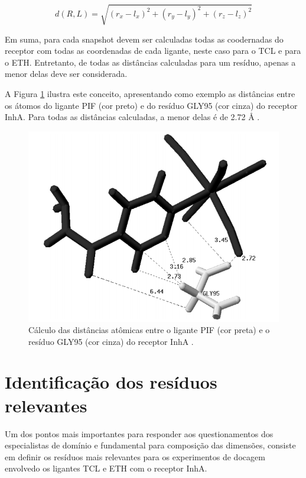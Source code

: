 \begin{equation}
\label{eqt:distEuclid}
	d(R,L)=\sqrt{(r_{x}-l_{x})^{2}+(r_{y}-l_{y})^{2}+(r_{z}-l_{z})^{2}}
\end{equation}

Em suma, para cada snapshot devem ser calculadas todas as coodernadas do receptor com todas as coordenadas de cada ligante, neste caso para o TCL e para o ETH. Entretanto, de todas as distâncias calculadas para um resíduo, apenas a menor delas deve ser considerada. 

A Figura \ref{fig:PIFvsGLY} ilustra este conceito, apresentando como exemplo as distâncias entre os átomos do ligante PIF (cor preto) e do resíduo GLY95 (cor cinza) do receptor InhA. Para todas as distâncias calculadas, a menor delas é de 2.72 {\AA} \cite{KARANADUNOSM09}.

\begin{figure}[h]
	\center
	\includegraphics[scale=0.5]{images/distEucli.png}
	\caption{Cálculo das distâncias atômicas entre o ligante PIF (cor preta) e o resíduo GLY95 (cor cinza) do receptor InhA \cite{MAC10}.}
	\label{fig:PIFvsGLY}
\end{figure} 

\section{Identificação dos resíduos relevantes}

Um dos pontos mais importantes para responder aos questionamentos dos especialistas de domínio e fundamental para composição das dimensões, consiste em definir os resíduos mais relevantes para os experimentos de docagem envolvedo os ligantes TCL e ETH com o receptor InhA. 

